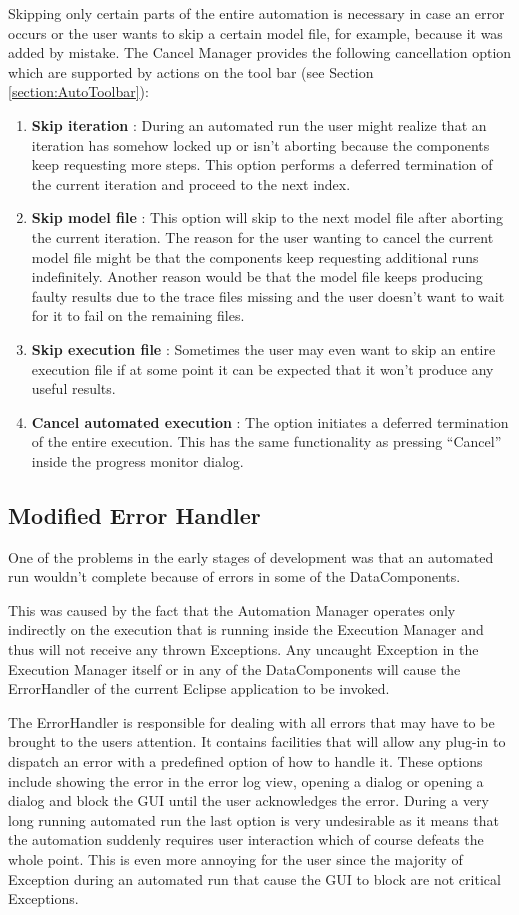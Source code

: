 Skipping only certain parts of the entire automation is necessary in case an error occurs
or the user wants to skip a certain model file, for example, because it was added by mistake.
The Cancel Manager provides the following cancellation option which are supported by
actions on the tool bar (see Section \ref{section:AutoToolbar}):
\begin{enumerate}
 \item \textbf{Skip iteration} : During an automated run the user might realize that an
iteration has somehow locked up or isn't aborting because the components keep requesting more
steps. This option performs a deferred termination of the current iteration
and proceed to the next index.
 \item \textbf{Skip model file} : This option will skip to the next model file after aborting 
the current iteration. The reason for the user wanting to cancel the current model file 
might be that the components keep requesting additional runs indefinitely. 
Another reason would be that the model file keeps producing faulty results
due to the trace files missing and the user doesn't want to wait for it to fail on the remaining files.
 \item \textbf{Skip execution file} : Sometimes the user may even want to skip an entire execution
file if at some point it can be expected that it won't produce any useful results.
 \item \textbf{Cancel automated execution} : The option initiates a deferred
termination of the entire execution. This has the same functionality as pressing ``Cancel'' inside the 
progress monitor dialog.
\end{enumerate}

\subsection{Modified Error Handler}
\label{section:ErrorHandler}
One of the problems in the early stages of development was that an automated run wouldn't complete
because of errors in some of the DataComponents.

This was caused by the fact that the Automation Manager operates only indirectly on the execution
that is running inside the Execution Manager and thus will not receive any thrown Exceptions.
Any uncaught Exception in the Execution Manager itself or in any of the DataComponents will
cause the ErrorHandler of the current Eclipse application to be invoked.

The ErrorHandler is responsible for dealing with all errors that may have to be brought
to the users attention. It contains facilities that will allow any plug-in to dispatch an
error with a predefined option of how to handle it. These options include showing the error
in the error log view, opening a dialog or opening a dialog and block the \ac{GUI} until the user
acknowledges the error. During a very long running automated run the last option is very
undesirable as it means that the automation suddenly requires user interaction which of course
defeats the whole point. This is even more annoying for the user since the majority of
Exception during an automated run that cause the \ac{GUI} to block are not critical Exceptions.


